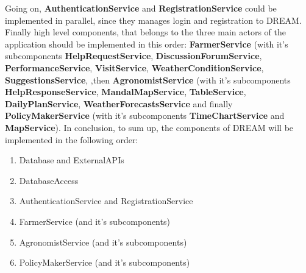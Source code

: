 Going on, \textbf{AuthenticationService} and \textbf{RegistrationService} could be implemented in parallel, since they manages login and registration to DREAM.\newline
Finally high level components, that belongs to the three main actors of the application should be implemented in this order: \textbf{FarmerService} (with it's subcomponents \textbf{HelpRequestService}, \textbf{DiscussionForumService}, \textbf{PerformanceService}, \textbf{VisitService}, \textbf{WeatherConditionService}, \textbf{SuggestionsService},\newline
,then \textbf{AgronomistService} (with it's subcomponents \textbf{HelpResponseService}, \textbf{MandalMapService}, \textbf{TableService}, \textbf{DailyPlanService}, \textbf{WeatherForecastsService}
\newline and finally \textbf{PolicyMakerService} (with it's subcomponents \textbf{TimeChartService} and \textbf{MapService}).\newline
In conclusion, to sum up, the components of DREAM will be implemented in the following order:
\begin{enumerate}
  \item Database and ExternalAPIs
  \item DatabaseAccess
  \item AuthenticationService and RegistrationService
  \item FarmerService (and it's subcomponents)
  \item AgronomistService (and it's subcomponents)
  \item PolicyMakerService (and it's subcomponents)
\end{enumerate}
\newpage